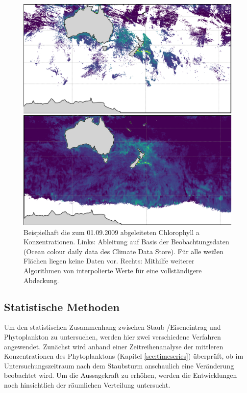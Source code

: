 \documentclass[12pt,a4paper,onecolumn]{scrartcl}
\begin{document}
\begin{figure}
	\begin{minipage}[c]{0.49\textwidth}
		\includegraphics[width=\textwidth]{bilder/chla_raw.png}
	\end{minipage}\hfill
	\begin{minipage}[c]{0.49\textwidth}
		 \includegraphics[width=\textwidth]{bilder/chla_interpol.png}
	\end{minipage}\hfill
	\caption{Beispielhaft die zum 01.09.2009 abgeleiteten Chlorophyll a Konzentrationen. Links: Ableitung auf Basis der Beobachtungsdaten (Ocean colour daily data des Climate Data Store). Für alle weißen Flächen liegen keine Daten vor. Rechts: Mithilfe weiterer Algorithmen von \citet{Saulquin.2019} interpolierte Werte für eine vollständigere Abdeckung.} \label{fig:chla}
\end{figure}
\subsection{Statistische Methoden} \label{sec:stats}
Um den statistischen Zusammenhang zwischen Staub-/Eiseneintrag und Phytoplankton zu untersuchen, werden hier zwei verschiedene Verfahren angewendet. Zunächst wird anhand einer Zeitreihenanalyse der mittleren Konzentrationen des Phytoplanktons (Kapitel \ref{sec:timeseries}) überprüft, ob im Untersuchungszeitraum nach dem Staubsturm  anschaulich eine Veränderung beobachtet wird. Um die Aussagekraft zu erhöhen, werden die Entwicklungen noch hinsichtlich der räumlichen Verteilung untersucht.
\end{document}
